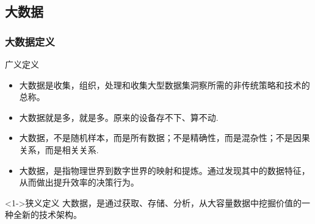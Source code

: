 \documentclass[10pt,aspectratio=43,mathserif,table]{beamer}
\begin{document}
\subsection{大数据}
\begin{frame}
	\frametitle{大数据定义}
	\begin{block}{广义定义}
		\begin{itemize}
			\item<1-> 大数据是收集，组织，处理和收集大型数据集洞察所需的非传统策略和技术的总称。
			\item<1-> 大数据就是多，就是多。原来的设备存不下、算不动.
			\item<1-> 大数据，不是随机样本，而是所有数据；不是精确性，而是混杂性；不是因果关系，而是相关关系.
			\item<1-> 大数据，是指物理世界到数字世界的映射和提炼。通过发现其中的数据特征，从而做出提升效率的决策行为。
		\end{itemize}
	\end{block}
	\begin{block}<1->{狭义定义}
		大数据，是通过获取、存储、分析，从大容量数据中挖掘价值的一种全新的技术架构。
	\end{block}
	
\end{frame}
\end{document}
